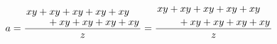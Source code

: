 \documentclass{article}
\begin{document}
\[
a=\frac{
\splitfrac{xy + xy + xy + xy + xy}
{+ xy + xy + xy + xy}
}
{z}
=\frac{
\splitdfrac{xy + xy + xy + xy + xy}
{+ xy + xy + xy + xy}
}
{z}
\]
\end{document}
